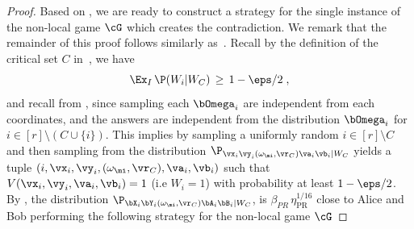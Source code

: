 \begin{proof}
	Based on , we are ready to construct a strategy for the single instance of the non-local game $\cG$ which creates the contradiction. We remark that the remainder of this proof follows similarly as~\cite[Section 6.2]{bavarianAnchoredParallelRepetition2021}. Recall by the definition of the critical set $C$ in~, we have
	\begin{equation*}
		\Ex_I\, \P (W_i | W_C) \,\geq \, 1 - \eps/2\;,
	\end{equation*}
	and recall from , since sampling each $\bOmega_i$ are independent from each coordinates, and the answers are independent from the distribution $\bOmega_i$ for $i \in [r] \setminus (C \cup \{i\})$. This implies by sampling a uniformly random $i \in [r] \setminus C$ and then sampling from the distribution $\P_{\vx_i \vy_i (\omega_{\mi}, \vr_C)  \va_i \vb_i| W_C}$ yields a tuple $(i,\vx_i,\vy_i,(\omega_{\mi}, \vr_C),\va_i,\vb_i)$ such that $V(\vx_i,\vy_i,\va_i,\vb_i) = 1$ (i.e $W_i = 1$) with probability at least $1 - \eps/2$. By , the distribution $\P_{\bX_i \bY_i (\omega_{\mi}, \vr_C)  \bA_i \bB_i| W_C}$, is $\beta_{PR}  \,\eta_{\text{PR}}^{1/16}$ close to Alice and Bob performing the following strategy for the non-local game $\cG$
	

\end{proof}
